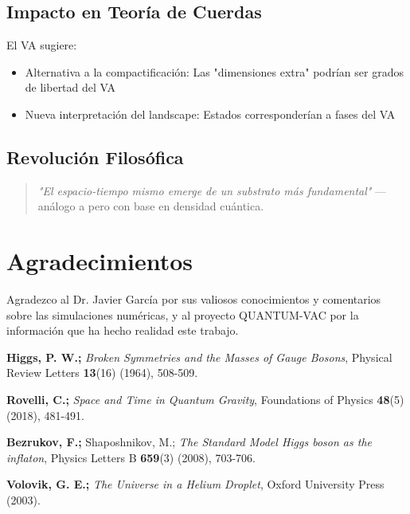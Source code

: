 \documentclass[twoside]{article}
\theoremstyle{definition}
\theoremstyle{remark}
\numberwithin{equation}{section}
\theoremstyle{definition}
\theoremstyle{example}
\theoremstyle{remark}
\numberwithin{equation}{section}%
\begin{document}
		\subsection{Impacto en Teoría de Cuerdas}
		El VA sugiere:
		
		\begin{itemize}
			\item Alternativa a la compactificación: Las "dimensiones extra" podrían ser grados de libertad del VA
			\item Nueva interpretación del landscape: Estados corresponderían a fases del VA
		\end{itemize}
		
		\subsection{Revolución Filosófica}
		\begin{quote}
			\textit{"El espacio-tiempo mismo emerge de un substrato más fundamental"} — análogo a \cite{Volovik2003} pero con base en densidad cuántica.
		\end{quote}
		
		\section*{Agradecimientos}
		Agradezco al Dr. Javier García por sus valiosos conocimientos y comentarios sobre las simulaciones numéricas, y al proyecto QUANTUM-VAC por la información que ha hecho realidad este trabajo.
		
		
		\begin{thebibliography}{99}
			\textbf{Higgs, P. W.;} \emph{Broken Symmetries and the Masses of Gauge Bosons}, Physical Review Letters \textbf{13}(16) (1964), 508-509.
			
			\textbf{Rovelli, C.;} \emph{Space and Time in Quantum Gravity}, Foundations of Physics \textbf{48}(5) (2018), 481-491.
			
			\textbf{Bezrukov, F.;} Shaposhnikov, M.; \emph{The Standard Model Higgs boson as the inflaton}, Physics Letters B \textbf{659}(3) (2008), 703-706.
			
			
			\textbf{ Volovik, G. E.;} \emph{The Universe in a Helium Droplet}, Oxford University Press (2003).
			
			
		\end{thebibliography}
		
		\label{end-art}
	
\end{document}
